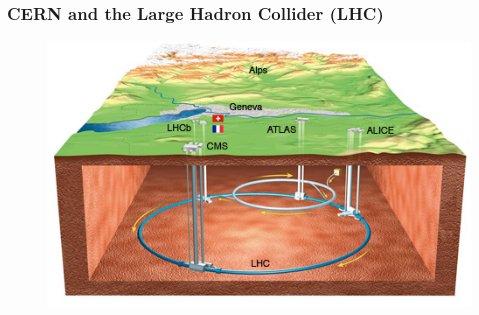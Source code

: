 \begin{frame}
\frametitle{CERN and the Large Hadron Collider (LHC)}

\begin{figure}[htbp]
\begin{center}
\includegraphics[width=1.0\textwidth]{images/CERNMap.jpg}
\end{center}
\end{figure}


\end{frame}


